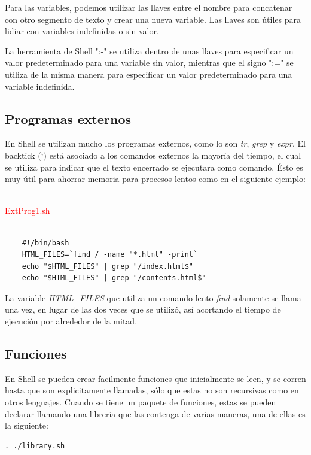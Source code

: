 \documentclass{article}
\begin{document}
Para las variables, podemos utilizar las llaves {} entre el nombre para concatenar con otro segmento de texto y crear una nueva variable. Las llaves son útiles para lidiar con variables indefinidas o sin valor.

La herramienta de Shell ":-" se utiliza dentro de unas llaves para especificar un valor predeterminado para una variable sin valor, mientras que el signo ":=" se utiliza de la misma manera para especificar un valor predeterminado para una variable indefinida.

\subsection{Programas externos}

En Shell se utilizan mucho los programas externos, como lo son \textit{tr}, \textit{grep} y \textit{expr}. El backtick (`) está asociado a los comandos externos la mayoría del tiempo, el cual se utiliza para indicar que el texto encerrado se ejecutara como comando. Ésto es muy útil para ahorrar memoria para procesos lentos como en el siguiente ejemplo:

~\\
\textcolor{red}{ExtProg1.sh}
\begin{framed}
\begin{verbatim}
	
    #!/bin/bash
    HTML_FILES=`find / -name "*.html" -print`
    echo "$HTML_FILES" | grep "/index.html$"
    echo "$HTML_FILES" | grep "/contents.html$"
\end{verbatim}
\end{framed}

La variable \textit{HTML\_FILES} que utiliza un comando lento \textit{find} solamente se llama una vez, en lugar de las dos veces que se utilizó, así acortando el tiempo de ejecución por alrededor de la mitad.

\subsection{Funciones}

En Shell se pueden crear facilmente funciones que inicialmente se leen, y se corren hasta que son explicitamente llamadas, sólo que estas no son recursivas como en otros lenguajes. Cuando se tiene un paquete de funciones, estas se pueden declarar llamando una libreria que las contenga de varias maneras, una de ellas es la siguiente:
\begin{verbatim}
. ./library.sh
\end{verbatim}
\end{document}
